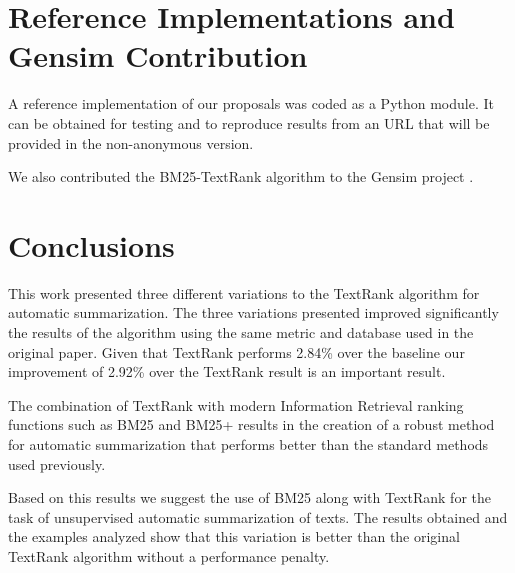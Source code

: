 \documentclass{llncs}
\begin{document}
\section{Reference Implementations and Gensim Contribution}
A reference implementation of our proposals was coded as a Python module. It can be obtained for testing and to reproduce results from an URL that will be provided in the non-anonymous version.

We also contributed the BM25-TextRank algorithm to the Gensim project \cite{gensim}.

\section{Conclusions}
This work presented three different variations to the TextRank algorithm for automatic summarization. The three variations presented improved significantly the results of the algorithm using the same metric and database used in the original paper. Given that TextRank performs 2.84\% over the baseline our improvement of 2.92\% over the TextRank result is an important result. 

The combination of TextRank with modern Information Retrieval ranking functions such as BM25 and BM25+ results in the creation of a robust method for automatic summarization that performs better than the standard methods used previously. 

Based on this results we suggest the use of BM25 along with TextRank for the task of unsupervised automatic summarization of texts. The results obtained and the examples analyzed show that this variation is better than the original TextRank algorithm without a performance penalty.

{}

\end{document}

